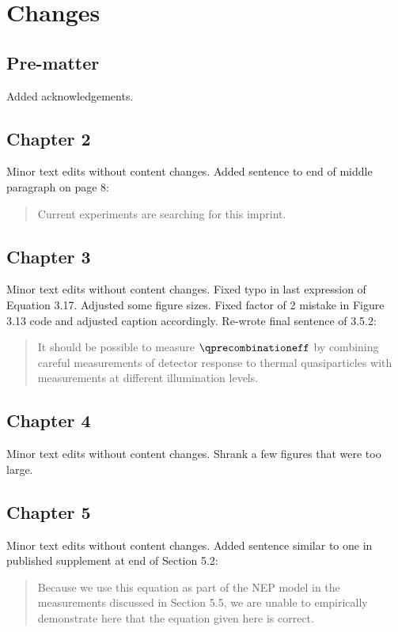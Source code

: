 \section*{Changes}
\setlength{\parindent}{0pt}

\subsection*{Pre-matter}
Added acknowledgements.

\subsection*{Chapter 2}
Minor text edits without content changes.
Added sentence to end of middle paragraph on page 8:
\begin{quote}
Current experiments are searching for this imprint.
\end{quote}

\subsection*{Chapter 3}
Minor text edits without content changes.
Fixed typo in last expression of Equation 3.17.
Adjusted some figure sizes.
Fixed factor of 2 mistake in Figure 3.13 code and adjusted caption accordingly.
Re-wrote final sentence of 3.5.2:
\begin{quote}
It should be possible to measure $\qprecombinationeff$ by combining careful measurements of detector response to thermal quasiparticles with measurements at different illumination levels.
\end{quote}

\subsection*{Chapter 4}
Minor text edits without content changes.
Shrank a few figures that were too large.

\subsection*{Chapter 5}
Minor text edits without content changes.
Added sentence similar to one in published supplement at end of Section 5.2:
\begin{quote}
Because we use this equation as part of the NEP model in the measurements discussed in Section 5.5, we are unable to empirically demonstrate here that the equation given here is correct.
\end{quote}

